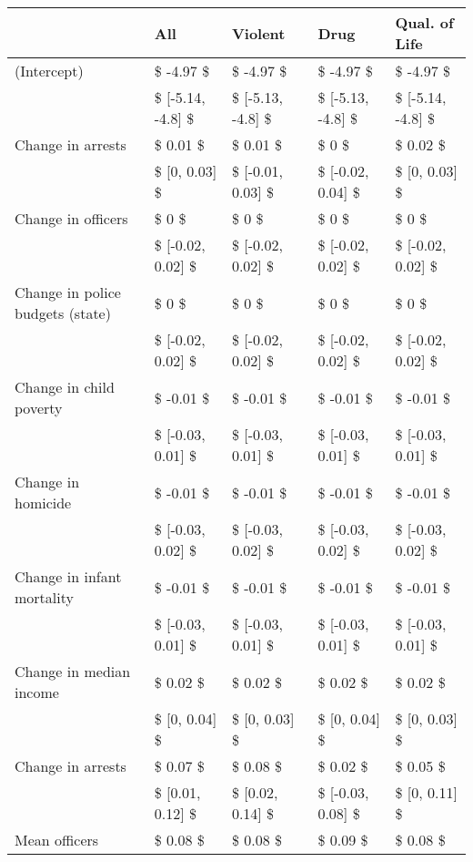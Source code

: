 \begin{table}[ht]
\centering
\begin{tabular}{lllll}
  \hline
  & All & Violent & Drug & Qual. of Life \\ 
  \hline
(Intercept) & \$ -4.97 \$ & \$ -4.97 \$ & \$ -4.97 \$ & \$ -4.97 \$ \\ 
   & \$ [-5.14, -4.8] \$ & \$ [-5.13, -4.8] \$ & \$ [-5.13, -4.8] \$ & \$ [-5.14, -4.8] \$ \\ 
  Change in arrests & \$ 0.01 \$ & \$ 0.01 \$ & \$ 0 \$ & \$ 0.02 \$ \\ 
   & \$ [0, 0.03] \$ & \$ [-0.01, 0.03] \$ & \$ [-0.02, 0.04] \$ & \$ [0, 0.03] \$ \\ 
  Change in officers & \$ 0 \$ & \$ 0 \$ & \$ 0 \$ & \$ 0 \$ \\ 
   & \$ [-0.02, 0.02] \$ & \$ [-0.02, 0.02] \$ & \$ [-0.02, 0.02] \$ & \$ [-0.02, 0.02] \$ \\ 
  Change in police budgets (state) & \$ 0 \$ & \$ 0 \$ & \$ 0 \$ & \$ 0 \$ \\ 
   & \$ [-0.02, 0.02] \$ & \$ [-0.02, 0.02] \$ & \$ [-0.02, 0.02] \$ & \$ [-0.02, 0.02] \$ \\ 
  Change in child poverty & \$ -0.01 \$ & \$ -0.01 \$ & \$ -0.01 \$ & \$ -0.01 \$ \\ 
   & \$ [-0.03, 0.01] \$ & \$ [-0.03, 0.01] \$ & \$ [-0.03, 0.01] \$ & \$ [-0.03, 0.01] \$ \\ 
  Change in homicide & \$ -0.01 \$ & \$ -0.01 \$ & \$ -0.01 \$ & \$ -0.01 \$ \\ 
   & \$ [-0.03, 0.02] \$ & \$ [-0.03, 0.02] \$ & \$ [-0.03, 0.02] \$ & \$ [-0.03, 0.02] \$ \\ 
  Change in infant mortality & \$ -0.01 \$ & \$ -0.01 \$ & \$ -0.01 \$ & \$ -0.01 \$ \\ 
   & \$ [-0.03, 0.01] \$ & \$ [-0.03, 0.01] \$ & \$ [-0.03, 0.01] \$ & \$ [-0.03, 0.01] \$ \\ 
  Change in median income & \$ 0.02 \$ & \$ 0.02 \$ & \$ 0.02 \$ & \$ 0.02 \$ \\ 
   & \$ [0, 0.04] \$ & \$ [0, 0.03] \$ & \$ [0, 0.04] \$ & \$ [0, 0.03] \$ \\ 
  Change in arrests & \$ 0.07 \$ & \$ 0.08 \$ & \$ 0.02 \$ & \$ 0.05 \$ \\ 
   & \$ [0.01, 0.12] \$ & \$ [0.02, 0.14] \$ & \$ [-0.03, 0.08] \$ & \$ [0, 0.11] \$ \\ 
  Mean officers & \$ 0.08 \$ & \$ 0.08 \$ & \$ 0.09 \$ & \$ 0.08 \$ \\ 

\end{tabular}
\end{table}
